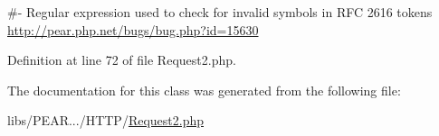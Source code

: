 \#-\/ Regular expression used to check for invalid symbols in R\+FC 2616 tokens \hyperlink{}{http\+://pear.\+php.\+net/bugs/bug.\+php?id=15630}

Definition at line 72 of file Request2.\+php.



The documentation for this class was generated from the following file\+:\begin{DoxyCompactItemize}
\item 
libs/\+P\+E\+A\+R.../\+H\+T\+T\+P/\hyperlink{Request2_8php}{Request2.\+php}\end{DoxyCompactItemize}
